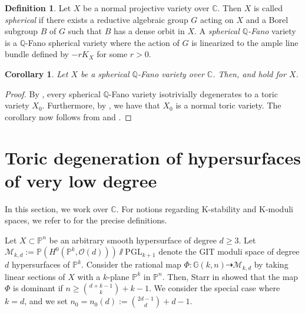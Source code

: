 \documentclass[11pt,reqno]{amsart}
\newcommand{\C}{\mathbb{C}}
\newcommand{\Q}{\mathbb{Q}}
\newcommand{\cM}{\mathcal{M}}
\newcommand{\cO}{\mathcal{O}}
\newcommand{\bP}{\mathbb{P}}
\newcommand{\bC}{\mathbb{C}}
\newcommand{\bG}{\mathbb{G}}
\newcommand{\PP}{\mathbb{P}}
\newcommand{\PGL}{\mathrm{PGL}}
\numberwithin{equation}{section}
\newtheorem{cor}[prop]{Corollary}
\theoremstyle{definition}
\newtheorem{defi}[prop] {Definition}
\begin{document}
\begin{defi} \label{dfn:spherical}
    Let $X$ be a normal projective variety over $\C$. Then $X$ is called \emph{spherical} if there exists a reductive algebraic group $G$ acting on $X$ and a Borel subgroup $B$ of $G$ such that $B$ has a dense orbit in $X$. A \emph{spherical $\Q$-Fano} variety is a $\Q$-Fano spherical variety where the action of $G$ is linearized to the ample line bundle defined by $-rK_X$ for some $r >0$.
\end{defi}


\begin{cor} \label{cor:spherical}
Let $X$ be a spherical $\Q$-Fano variety over $\C$.
 Then,  and  hold for $X$.
\end{cor} 
\begin{proof}
    By \cite[Theorem 3.2]{AlexeevBrionToricDegenerationsofspherical}, every spherical $\Q$-Fano variety isotrivially degenerates to a toric variety $X_0$. Furthermore, by \cite[Proposition 2.4 and Remark 3.9]{AlexeevBrionToricDegenerationsofspherical}, we have that $X_0$ is a normal toric variety. The corollary now follows from  and .
\end{proof}


\section{Toric degeneration of hypersurfaces of very low degree} \label{section:hypersurfaces}



In this section, we work over $\bC$. For notions regarding K-stability and K-moduli spaces, we refer to \cite{XuKstabilitybook} for the precise definitions.


Let $X\subset \bP^{n}$ be an arbitrary smooth hypersurface of degree $d\geq 3$. Let $\cM_{k,d} := \bP(H^0(\bP^k, \cO(d)))\sslash \PGL_{k+1}$ denote the GIT moduli space of degree $d$ hypersurfaces of $\PP^k$. Consider the rational map  $\Phi:\bG(k,n)\dashrightarrow \cM_{k,d}$ by taking linear sections of $X$ with a $k$-plane $\bP^k$ in $\bP^n$. Then, Starr in \cite{Sta06} showed that the map $\Phi$ is dominant if $n\geq \binom{d+k -1}{k} +k-1$. We consider the special case where $k=d$, and we set $n_0=n_0(d):=\binom{2d -1}{d} +d-1$.
\end{document}
